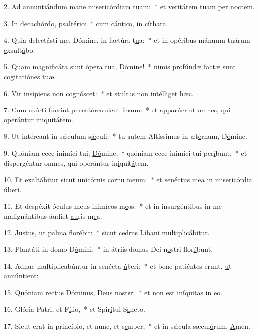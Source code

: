2. Ad annuntiándum mane misericórdiam t\uline{u}am:~* et veritátem t\uline{u}am per n\uline{o}ctem.\par 
3. In decachórdo, psalt\uline{é}rio:~* cum cántic\uline{o}, in c\uline{í}thara.\par 
4. Quia delectásti me, Dómine, in factúra t\uline{u}a:~* et in opéribus mánuum tuárum \uline{e}xsult\uline{á}bo.\par 
5. Quam magnificáta sunt ópera tua, D\uline{ó}mine!~* nimis profúndæ factæ sunt cogitati\uline{ó}nes t\uline{u}æ.\par 
6. Vir insípiens non cogn\uline{ó}scet:~* et stultus non int\uline{é}llig\uline{e}t hæc.\par 
7. Cum exórti fúerint peccatóres sicut f\uline{e}num:~* et apparúerint omnes, qui operántur in\uline{i}quit\uline{á}tem.\par 
8. Ut intéreant in sǽculum s\uline{ǽ}culi:~* tu autem Altíssimus in æt\uline{é}rnum, D\uline{ó}mine.\par 
9. Quóniam ecce inimíci tui, \uline{Dó}mine,~† quóniam ecce inimíci tui per\uline{í}bunt:~* et dispergéntur omnes, qui operántur in\uline{i}quit\uline{á}tem.\par 
10. Et exaltábitur sicut unicórnis cornu m\uline{e}um:~* et senéctus mea in miseric\uline{ó}rdia \uline{ú}beri.\par 
11. Et despéxit óculus meus inimícos m\uline{e}os:~* et in insurgéntibus in me malignántibus áudiet \uline{au}ris m\uline{e}a.\par 
12. Justus, ut palma flor\uline{é}bit:~* sicut cedrus Líbani mult\uline{i}plic\uline{á}bitur.\par 
13. Plantáti in domo D\uline{ó}mini,~* in átriis domus Dei n\uline{o}stri flor\uline{é}bunt.\par 
14. Adhuc multiplicabúntur in senécta \uline{ú}beri:~* et bene patiéntes erunt, \uline{u}t ann\uline{ú}ntient:\par 
15. Quóniam rectus Dóminus, Deus n\uline{o}ster:~* et non est iníquit\uline{a}s in \uline{e}o.\par 
16. Glória Patri, et F\uline{í}lio,~* et Spir\uline{í}tui S\uline{a}ncto.\par 
17. Sicut erat in princípio, et nunc, et s\uline{e}mper,~* et in sǽcula sæcul\uline{ó}rum. \uline{A}men.\par 
